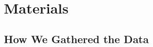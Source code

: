 \documentclass[11pt]{article}
\begin{document}
\section{Materials}
\label{sec:materials}

\subsection{How We Gathered the Data}
\label{sec:pipeline}

%
%
%
%
\end{document}
